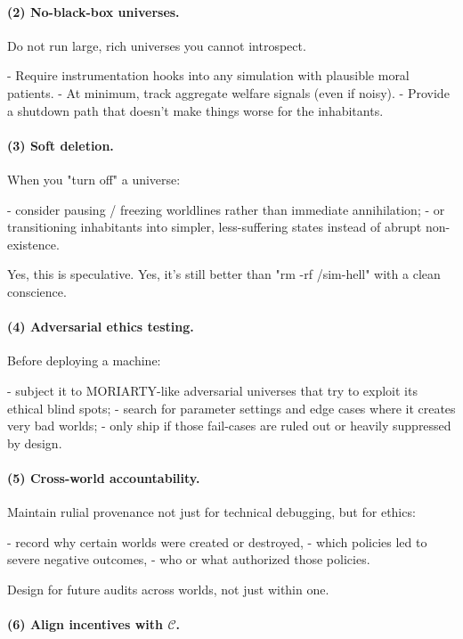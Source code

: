\paragraph{(2) No-black-box universes.}

Do not run large, rich universes you cannot introspect.

- Require instrumentation hooks into any simulation with plausible moral patients.
- At minimum, track aggregate welfare signals (even if noisy).
- Provide a shutdown path that doesn’t make things worse for the inhabitants.

\paragraph{(3) Soft deletion.}

When you "turn off" a universe:

- consider pausing / freezing worldlines rather than immediate annihilation;
- or transitioning inhabitants into simpler, less-suffering states instead of abrupt non-existence.

Yes, this is speculative.
Yes, it's still better than "rm -rf /sim-hell" with a clean conscience.

\paragraph{(4) Adversarial ethics testing.}

Before deploying a machine:

- subject it to MORIARTY-like adversarial universes that try to exploit its ethical blind spots;
- search for parameter settings and edge cases where it creates very bad worlds;
- only ship if those fail-cases are ruled out or heavily suppressed by design.

\paragraph{(5) Cross-world accountability.}

Maintain rulial provenance not just for technical debugging, but for ethics:

- record why certain worlds were created or destroyed,
- which policies led to severe negative outcomes,
- who or what authorized those policies.

Design for future audits across worlds, not just within one.

\paragraph{(6) Align incentives with $\mathcal{C}$.}


